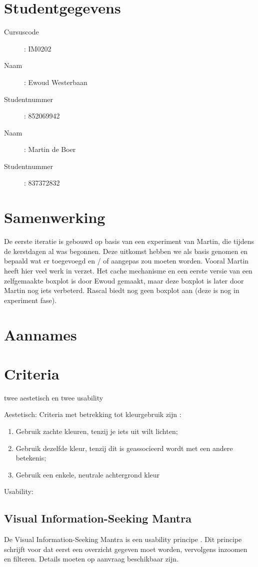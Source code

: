 \documentclass[a4paper]{article}
\begin{document}
\pagestyle{fancy}

\section*{Studentgegevens}
\begin{description}
	\item [Cursuscode]: IM0202
	\item [Naam]: Ewoud Westerbaan
	\item [Studentnummer]: 852069942
	\item [Naam]: Martin de Boer
	\item [Studentnummer]: 837372832
\end{description}

\section{Samenwerking}
De eerste iteratie is gebouwd op basis van een experiment van Martin, die tijdens de kerstdagen al was begonnen. Deze uitkomst hebben we als basis genomen en bepaald wat er toegevoegd en / of aangepas zou moeten worden. Vooral Martin heeft hier veel werk in verzet.
Het cache mechanisme en een eerste versie van een zelfgemaakte boxplot is door Ewoud gemaakt, maar deze boxplot is later door Martin nog iets verbeterd. Rascal biedt nog geen boxplot aan (deze is nog in experiment fase).


\section{Aannames}


\section{Criteria}
twee aestetisch en twee usability

Aestetisch:
Criteria met betrekking tot kleurgebruik zijn \cite{B}:
\begin{enumerate}
\item Gebruik zachte kleuren, tenzij je iets uit wilt lichten;
\item Gebruik dezelfde kleur, tenzij dit is geassocieerd wordt met een andere betekenis;
\item Gebruik een enkele, neutrale achtergrond kleur
\end{enumerate}

Usability:
\subsection{Visual Information-Seeking Mantra}
De Visual Information-Seeking Mantra is een usability principe \cite{A}. Dit principe schrijft voor dat eerst een overzicht gegeven moet worden, vervolgens inzoomen en filteren. Details moeten op aanvraag beschikbaar zijn.
\end{document}

